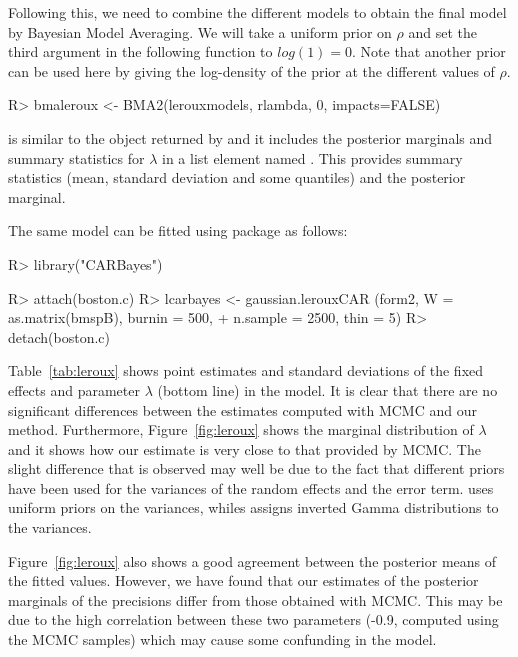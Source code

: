 \documentclass[article]{jss}
\begin{document}
Following this, we need to combine the different models to obtain the final
model by Bayesian Model Averaging. We will take a uniform prior on $\rho$ and
set the third argument in the following function to $log(1)=0$. Note that
another prior can be used here by giving the log-density of the prior at the
different values of $\rho$.



\begin{Schunk}
\begin{Sinput}
R> bmaleroux <- BMA2(lerouxmodels, rlambda, 0, impacts=FALSE)
\end{Sinput}
\end{Schunk}


\noindent
{} is similar to the object returned by  and it
includes the posterior marginals and summary statistics for $\lambda$
in a list element named . This provides summary statistics (mean,
standard deviation and some quantiles) and the posterior marginal.

The same model can be fitted using package  \citep{CARBayes:2013}
as follows:

\begin{Schunk}
\begin{Sinput}
R> library("CARBayes")
\end{Sinput}
\end{Schunk}
\begin{Schunk}
\begin{Sinput}
R> attach(boston.c)
R> lcarbayes <-  gaussian.lerouxCAR (form2, W = as.matrix(bmspB), burnin = 500, 
+     n.sample = 2500, thin = 5)
R> detach(boston.c)
\end{Sinput}
\end{Schunk}


Table~\ref{tab:leroux} shows point estimates and standard deviations of the
fixed effects and parameter $\lambda$ (bottom line) in the model. It is clear
that there are no significant differences between the estimates computed with
MCMC and our method.  Furthermore, Figure~\ref{fig:leroux} shows the marginal
distribution of $\lambda$ and it shows how our estimate is very close to that
provided by MCMC. The slight difference that is observed may well be due to the
fact that different priors have been used for the variances of the random
effects and the error term.  uses uniform priors on the variances,
whiles  assigns inverted Gamma distributions to the variances.

Figure~\ref{fig:leroux} also shows a good agreement between the posterior
means of the fitted values. However, we have found that our estimates
of the posterior marginals of the precisions differ from those obtained
with MCMC. This may be due to the high correlation between these two parameters
(-0.9, computed using the MCMC samples) which may cause some confunding in the
model.
\end{document}
